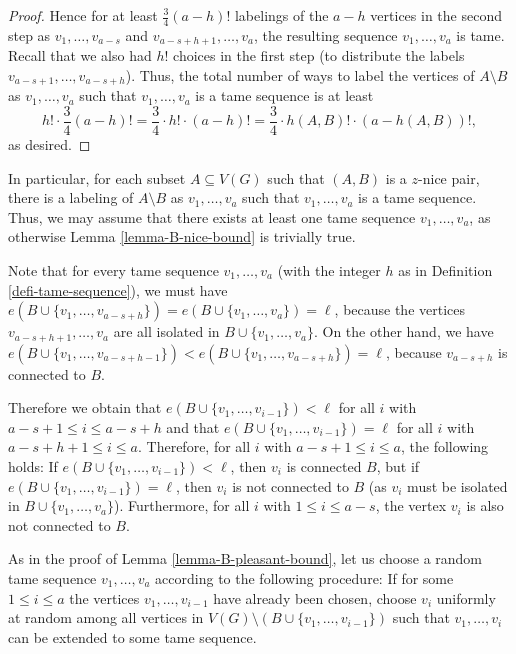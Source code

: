 \begin{proof}
Hence for at least $\frac{3}{4}(a-h)!$ labelings of the $a-h$ vertices in the second step as $v_1,\dots,v_{a-s}$ and $v_{a-s+h+1},\dots,v_a$, the resulting sequence $v_1,\dots,v_a$ is tame. Recall that we also had $h!$ choices in the first step (to distribute the labels $v_{a-s+1},\dots,v_{a-s+h}$). Thus, the total number of ways to  label the vertices of $A\setminus B$ as $v_1,\dots,v_a$ such that $v_1,\dots,v_a$ is a tame sequence is at least
\[h!\cdot\frac{3}{4}(a-h)!=\frac{3}{4}\cdot  h!\cdot (a-h)!=\frac{3}{4}\cdot  h(A,B)!\cdot (a-h(A,B))!,\]
as desired.
\end{proof}

In particular, for each subset $A\subseteq V(G)$ such that $(A,B)$ is a $z$-nice pair, there is a labeling of $A\setminus B$ as $v_1,\dots,v_a$ such that $v_1,\dots,v_a$ is a tame sequence. Thus, we may assume that there exists at least one tame sequence $v_1,\dots,v_a$, as otherwise Lemma \ref{lemma-B-nice-bound} is trivially true.

Note that for every tame sequence $v_1,\dots,v_a$ (with the integer $h$ as in Definition \ref{defi-tame-sequence}), we must have $e(B\cup \lbrace v_1,\dots,v_{a-s+h}\rbrace)=e(B\cup \lbrace v_1,\dots,v_a\rbrace)=\ell$, because the vertices $v_{a-s+h+1},\dots,v_a$ are all isolated in $B\cup \lbrace v_1,\dots,v_a\rbrace$. On the other hand, we have $e(B\cup \lbrace v_1,\dots,v_{a-s+h-1}\rbrace)<e(B\cup \lbrace v_1,\dots,v_{a-s+h}\rbrace)=\ell$, because $v_{a-s+h}$ is connected to $B$.

Therefore we obtain that $e(B\cup \lbrace v_1,\dots,v_{i-1}\rbrace)<\ell$ for all $i$ with $a-s+1\leq i\leq a-s+h$ and that $e(B\cup \lbrace v_1,\dots,v_{i-1}\rbrace)=\ell$ for all $i$ with $a-s+h+1\leq i\leq a$. Therefore, for all $i$ with $a-s+1\leq i\leq a$, the following holds: If $e(B\cup \lbrace v_1,\dots,v_{i-1}\rbrace)<\ell$, then $v_i$ is connected $B$, but if $e(B\cup \lbrace v_1,\dots,v_{i-1}\rbrace)=\ell$, then $v_i$ is not connected to $B$ (as $v_i$ must be isolated in $B\cup \lbrace v_1,\dots,v_a\rbrace$). Furthermore, for all $i$ with $1\leq i\leq a-s$, the vertex $v_i$ is also not connected to $B$.

As in the proof of Lemma \ref{lemma-B-pleasant-bound}, let us choose a random tame sequence $v_1,\dots,v_a$ according to the following procedure: If for some $1\leq i\leq a$ the vertices $v_1,\dots, v_{i-1}$ have already been chosen, choose $v_{i}$ uniformly at random among all vertices in $V(G)\setminus (B\cup \lbrace v_1,\dots, v_{i-1}\rbrace)$ such that $v_1,\dots, v_{i}$ can be extended to some tame sequence.

